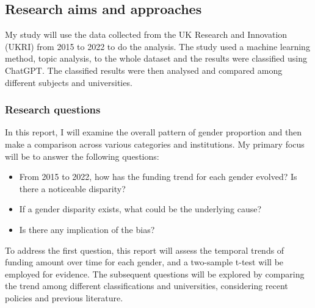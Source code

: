 \subsection{Research aims and approaches}

My study will use the data collected from the UK Research and Innovation (UKRI) from 2015 to 2022 to do the analysis. The study used a machine learning method, topic analysis, to the whole dataset and the results were classified using ChatGPT. The classified results were then analysed and compared among different subjects and universities.

\subsubsection{Research questions}

In this report, I will examine the overall pattern of gender proportion and then make a comparison across various categories and institutions. My primary focus will be to answer the following questions:
\begin{itemize}
    \item From 2015 to 2022, how has the funding trend for each gender evolved? Is there a noticeable disparity?
    \item If a gender disparity exists, what could be the underlying cause?
    \item Is there any implication of the bias?
\end{itemize}
\bigbreak
\noindent To address the first question, this report will assess the temporal trends of funding amount over time for each gender, and a two-sample t-test will be employed for evidence. The subsequent questions will be explored by comparing the trend among different classifications and universities, considering recent policies and previous literature.
